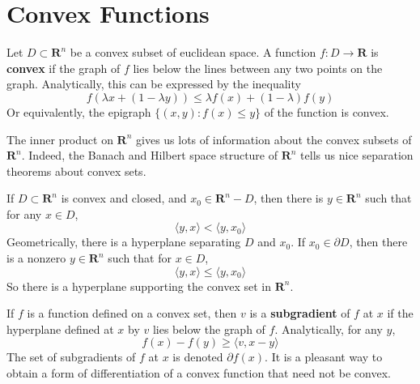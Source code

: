 \chapter{Convex Functions}

Let $D \subset \mathbf{R}^n$ be a convex subset of euclidean space. A function $f: D \to \mathbf{R}$ is {\bf convex} if the graph of $f$ lies below the lines between any two points on the graph. Analytically, this can be expressed by the inequality
%
\[ f(\lambda x + (1 - \lambda y)) \leq \lambda f(x) + (1 - \lambda) f(y) \]
%
Or equivalently, the epigraph $\{ (x,y): f(x) \leq y \}$ of the function is convex.

The inner product on $\mathbf{R}^n$ gives us lots of information about the convex subsets of $\mathbf{R}^n$. Indeed, the Banach and Hilbert space structure of $\mathbf{R}^n$ tells us nice separation theorems about convex sets.

\begin{theorem}
    If $D \subset \mathbf{R}^n$ is convex and closed, and $x_0 \in \mathbf{R}^n - D$, then there is $y \in \mathbf{R}^n$ such that for any $x \in D$,
    \[ \langle y, x \rangle < \langle y, x_0 \rangle \]
    Geometrically, there is a hyperplane separating $D$ and $x_0$. If $x_0 \in \partial D$, then there is a nonzero $y \in \mathbf{R}^n$ such that for $x \in D$,
    \[ \langle y, x \rangle \leq \langle y, x_0 \rangle \]
    So there is a hyperplane supporting the convex set in $\mathbf{R}^n$.
\end{theorem}

If $f$ is a function defined on a convex set, then $v$ is a {\bf subgradient} of $f$ at $x$ if the hyperplane defined at $x$ by $v$ lies below the graph of $f$. Analytically, for any $y$,
%
\[ f(x) - f(y) \geq \langle v, x - y \rangle \]
%
The set of subgradients of $f$ at $x$ is denoted $\partial f(x)$. It is a pleasant way to obtain a form of differentiation of a convex function that need not be convex.

